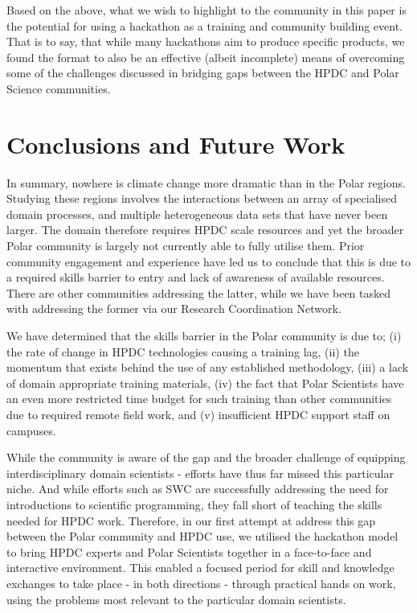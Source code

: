 \documentclass[conference]{IEEEtran}
\begin{document}
Based on the above, what we wish to highlight to the community in this paper is the potential for using a hackathon as a training and community building event.  That is to say, that while many hackathons aim to produce specific products, we found the format to also be an effective (albeit incomplete) means of overcoming some of the challenges discussed in bridging gaps between the HPDC and Polar Science communities.

\section{Conclusions and Future Work}
In summary, nowhere is climate change more dramatic than in the Polar regions.  Studying these regions involves the interactions between an array of specialised domain processes, and multiple heterogeneous data sets that have never been larger.  The domain therefore requires HPDC scale resources and yet the broader Polar community is largely not currently able to fully utilise them.  Prior community engagement and experience have led us to conclude that this is due to a required skills barrier to entry and lack of awareness of available resources.  There are other communities addressing the latter, while we have been tasked with addressing the former via our Research Coordination Network.

We have determined that the skills barrier in the Polar community is due to; (i) the rate of change in HPDC technologies causing a training lag, (ii) the momentum that exists behind the use of any established methodology, (iii) a lack of domain appropriate training materials, (iv) the fact that Polar Scientists have an even more restricted time budget for such training than other communities due to required remote field work, and (v) insufficient HPDC support staff on campuses.

While the community is aware of the gap and the broader challenge of equipping interdisciplinary domain scientists - efforts have thus far missed this particular niche.  And while efforts such as SWC are successfully addressing the need for introductions to scientific programming, they fall short of teaching the skills needed for HPDC work.  Therefore, in our first attempt at address this gap between the Polar community and HPDC use, we utilised the hackathon model to bring HPDC experts and Polar Scientists together in a face-to-face and interactive environment.  This enabled a focused period for skill and knowledge exchanges to take place - in both directions - through practical hands on work, using the problems most relevant to the particular domain scientists.  
\end{document}
